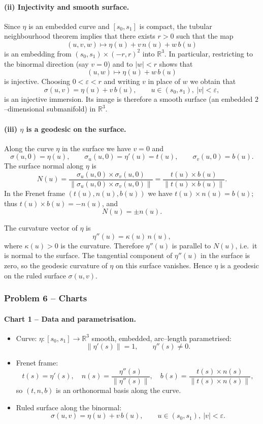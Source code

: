 \documentclass[12pt,a4paper]{article}
\theoremstyle{plain}
\theoremstyle{definition}      %
\begin{document}
	\paragraph{(ii) Injectivity and smooth surface.}
	Since $\eta$ is an embedded curve and $[s_0,s_1]$ is compact, the tubular
	neighbourhood theorem implies that there exists $r>0$ such that the map
	\[
	(u,v,w)\mapsto \eta(u)+v\,n(u)+w\,b(u)
	\]
	is an embedding from $(s_0,s_1)\times(-r,r)^2$ into $\mathbb{R}^3$.  In
	particular, restricting to the binormal direction (say $v=0$) and to
	$|w|<r$ shows that
	\[
	(u,w)\mapsto \eta(u)+w\,b(u)
	\]
	is injective.  Choosing $0<\varepsilon<r$ and writing $v$ in place of $w$ we
	obtain that
	\[
	\sigma(u,v)=\eta(u)+v\,b(u),\qquad u\in(s_0,s_1),\ |v|<\varepsilon,
	\]
	is an injective immersion.  Its image is therefore a smooth surface (an
	embedded $2$--dimensional submanifold) in $\mathbb{R}^3$.
	
	\paragraph{(iii) $\eta$ is a geodesic on the surface.}
	Along the curve $\eta$ in the surface we have $v=0$ and
	\[
	\sigma(u,0)=\eta(u),\qquad
	\sigma_u(u,0)=\eta'(u)=t(u),\qquad
	\sigma_v(u,0)=b(u).
	\]
	The surface normal along $\eta$ is
	\[
	N(u)=\frac{\sigma_u(u,0)\times\sigma_v(u,0)}
	{\|\sigma_u(u,0)\times\sigma_v(u,0)\|}
	= \frac{t(u)\times b(u)}{\|t(u)\times b(u)\|}.
	\]
	In the Frenet frame $(t(u),n(u),b(u))$ we have
	$t(u)\times n(u)=b(u)$; thus $t(u)\times b(u)=-n(u)$, and
	\[
	N(u) = \pm n(u).
	\]
	
	The curvature vector of $\eta$ is
	\[
	\eta''(u) = \kappa(u)\,n(u),
	\]
	where $\kappa(u)>0$ is the curvature.  Therefore $\eta''(u)$ is parallel to
	$N(u)$, i.e.\ it is normal to the surface.  The tangential component of
	$\eta''(u)$ in the surface is zero, so the geodesic curvature of $\eta$ on
	this surface vanishes.  Hence $\eta$ is a geodesic on the ruled surface
	$\sigma(u,v)$.
	
	
	\subsubsection*{Problem 6 – Charts}
	
	\paragraph{Chart 1 – Data and parametrisation.}
	\begin{itemize}
		\item Curve: $\eta:[s_0,s_1]\to\mathbb{R}^3$ smooth, embedded, arc--length
		parametrised:
		\[
		\|\eta'(s)\|=1,\qquad \eta''(s)\neq0.
		\]
		\item Frenet frame:
		\[
		t(s)=\eta'(s),\quad
		n(s)=\frac{\eta''(s)}{\|\eta''(s)\|},\quad
		b(s)=\frac{t(s)\times n(s)}{\|t(s)\times n(s)\|},
		\]
		so $(t,n,b)$ is an orthonormal basis along the curve.
		\item Ruled surface along the binormal:
		\[
		\sigma(u,v)=\eta(u)+v\,b(u),\qquad
		u\in(s_0,s_1),\ |v|<\varepsilon.
		\]
	\end{itemize}
	
\end{document}
